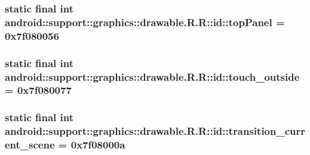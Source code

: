 \hypertarget{classandroid_1_1support_1_1graphics_1_1drawable_1_1_r_1_1id_d1197466e1a805eb706bbcffba9e688d}{
\subsubsection[{topPanel}]{\setlength{\rightskip}{0pt plus 5cm}static final int android::support::graphics::drawable.R.R::id::topPanel = 0x7f080056}}
\label{classandroid_1_1support_1_1graphics_1_1drawable_1_1_r_1_1id_d1197466e1a805eb706bbcffba9e688d}


\hypertarget{classandroid_1_1support_1_1graphics_1_1drawable_1_1_r_1_1id_3ae3a037e41e584121d47d5130828dda}{
\subsubsection[{touch\_\-outside}]{\setlength{\rightskip}{0pt plus 5cm}static final int android::support::graphics::drawable.R.R::id::touch\_\-outside = 0x7f080077}}
\label{classandroid_1_1support_1_1graphics_1_1drawable_1_1_r_1_1id_3ae3a037e41e584121d47d5130828dda}


\hypertarget{classandroid_1_1support_1_1graphics_1_1drawable_1_1_r_1_1id_3abb74be402aca9aa6a24647a57b555d}{
\subsubsection[{transition\_\-current\_\-scene}]{\setlength{\rightskip}{0pt plus 5cm}static final int android::support::graphics::drawable.R.R::id::transition\_\-current\_\-scene = 0x7f08000a}}
\label{classandroid_1_1support_1_1graphics_1_1drawable_1_1_r_1_1id_3abb74be402aca9aa6a24647a57b555d}


